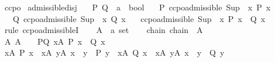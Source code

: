 \begin{isabellebody}
{\isafoldproof}%
%
\isadelimproof
\isanewline
%
\endisadelimproof
\isanewline
{}\isamarkupfalse%
\ ccpo\isanewline
{}\isanewline
\isanewline
{}\isamarkupfalse%
\ admissible{\isacharunderscore}{\kern0pt}disj{\isacharcolon}{\kern0pt}\isanewline
\ \ \ P\ Q\ {\isacharcolon}{\kern0pt}{\isacharcolon}{\kern0pt}\ {\isachardoublequoteopen}{\isacharprime}{\kern0pt}a\ {\isasymRightarrow}\ bool{\isachardoublequoteclose}\isanewline
\ \ \ P{\isacharcolon}{\kern0pt}\ {\isachardoublequoteopen}ccpo{\isachardot}{\kern0pt}admissible\ Sup\ {\isacharparenleft}{\kern0pt}{\isasymle}{\isacharparenright}{\kern0pt}\ {\isacharparenleft}{\kern0pt}{\isasymlambda}x{\isachardot}{\kern0pt}\ P\ x{\isacharparenright}{\kern0pt}{\isachardoublequoteclose}\isanewline
\ \ \ Q{\isacharcolon}{\kern0pt}\ {\isachardoublequoteopen}ccpo{\isachardot}{\kern0pt}admissible\ Sup\ {\isacharparenleft}{\kern0pt}{\isasymle}{\isacharparenright}{\kern0pt}\ {\isacharparenleft}{\kern0pt}{\isasymlambda}x{\isachardot}{\kern0pt}\ Q\ x{\isacharparenright}{\kern0pt}{\isachardoublequoteclose}\isanewline
\ \ \ {\isachardoublequoteopen}ccpo{\isachardot}{\kern0pt}admissible\ Sup\ {\isacharparenleft}{\kern0pt}{\isasymle}{\isacharparenright}{\kern0pt}\ {\isacharparenleft}{\kern0pt}{\isasymlambda}x{\isachardot}{\kern0pt}\ P\ x\ {\isasymor}\ Q\ x{\isacharparenright}{\kern0pt}{\isachardoublequoteclose}\isanewline
%
\isadelimproof
%
\endisadelimproof
%
\isatagproof
{}\isamarkupfalse%
\ {\isacharparenleft}{\kern0pt}rule\ ccpo{\isachardot}{\kern0pt}admissibleI{\isacharparenright}{\kern0pt}\isanewline
\ \ \isamarkupfalse%
\ A\ {\isacharcolon}{\kern0pt}{\isacharcolon}{\kern0pt}\ {\isachardoublequoteopen}{\isacharprime}{\kern0pt}a\ set{\isachardoublequoteclose}\isanewline
\ \ \isamarkupfalse%
\ chain{\isacharcolon}{\kern0pt}\ {\isachardoublequoteopen}chain\ {\isacharparenleft}{\kern0pt}{\isasymle}{\isacharparenright}{\kern0pt}\ A{\isachardoublequoteclose}\isanewline
\ \ \isamarkupfalse%
\ A{\isacharcolon}{\kern0pt}\ {\isachardoublequoteopen}A\ {\isasymnoteq}\ {\isacharbraceleft}{\kern0pt}{\isacharbraceright}{\kern0pt}{\isachardoublequoteclose}\ \ P{\isacharunderscore}{\kern0pt}Q{\isacharcolon}{\kern0pt}\ {\isachardoublequoteopen}{\isasymforall}x{\isasymin}A{\isachardot}{\kern0pt}\ P\ x\ {\isasymor}\ Q\ x{\isachardoublequoteclose}\isanewline
\ \ \isamarkupfalse%
\ {\isachardoublequoteopen}{\isacharparenleft}{\kern0pt}{\isasymexists}x{\isasymin}A{\isachardot}{\kern0pt}\ P\ x{\isacharparenright}{\kern0pt}\ {\isasymand}\ {\isacharparenleft}{\kern0pt}{\isasymforall}x{\isasymin}A{\isachardot}{\kern0pt}\ {\isasymexists}y{\isasymin}A{\isachardot}{\kern0pt}\ x\ {\isasymle}\ y\ {\isasymand}\ P\ y{\isacharparenright}{\kern0pt}\ {\isasymor}\ {\isacharparenleft}{\kern0pt}{\isasymexists}x{\isasymin}A{\isachardot}{\kern0pt}\ Q\ x{\isacharparenright}{\kern0pt}\ {\isasymand}\ {\isacharparenleft}{\kern0pt}{\isasymforall}x{\isasymin}A{\isachardot}{\kern0pt}\ {\isasymexists}y{\isasymin}A{\isachardot}{\kern0pt}\ x\ {\isasymle}\ y\ {\isasymand}\ Q\ y{\isacharparenright}{\kern0pt}{\isachardoublequoteclose}\isanewline

\end{isabellebody}
